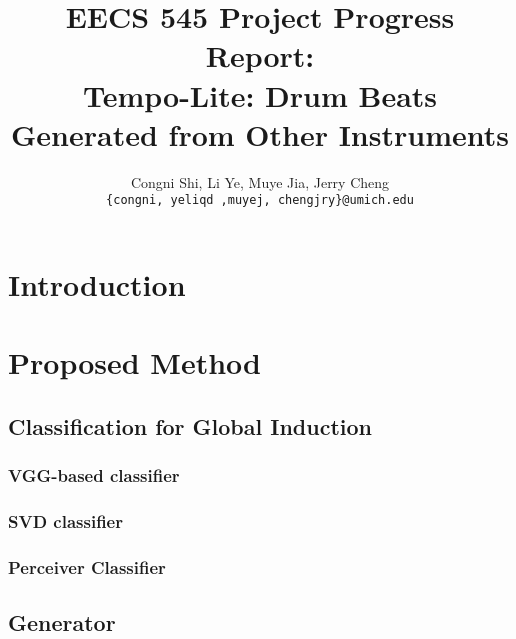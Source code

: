 \documentclass[11pt,letterpaper]{article}
\title{EECS 545 Project Progress Report: \\
        Tempo-Lite: Drum Beats Generated from Other Instruments}
\author{Congni Shi, Li Ye, Muye Jia, Jerry Cheng\\
        \texttt{\{congni, yeliqd ,muyej, chengjry\}@umich.edu}
}
\begin{document}
\maketitle


\section{Introduction}
    \label{sec:introduction}

\section{Proposed Method}
    \label{sec:proposed}

    \subsection{Classification for Global Induction}
        \label{sub:class}
        \subsubsection{VGG-based classifier} %
        \label{ssub:VGG-based classifier}
        
        \subsubsection{SVD classifier} %
        \label{ssub:SVD classifier}
        
        \subsubsection{Perceiver Classifier} %
        \label{ssub:Perceiver Classifier}

        
    \subsection{Generator}
    
\end{document}
